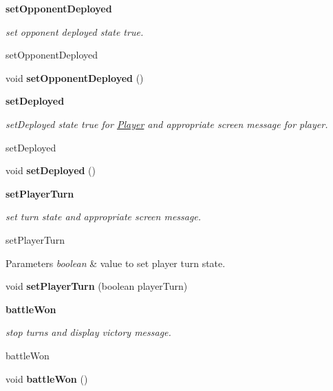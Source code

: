 \begin{Indent}{\bf set\+Opponent\+Deployed}\par
{\em set opponent deployed state true.

set\+Opponent\+Deployed }\begin{DoxyCompactItemize}
\item 
\hypertarget{classbattleship_1_1game_1_1Player_a99bdf9c151fbc819915510085994ec6c}{}void {\bfseries set\+Opponent\+Deployed} ()\label{classbattleship_1_1game_1_1Player_a99bdf9c151fbc819915510085994ec6c}

\end{DoxyCompactItemize}
\end{Indent}
\begin{Indent}{\bf set\+Deployed}\par
{\em set\+Deployed state true for \hyperlink{classbattleship_1_1game_1_1Player}{Player} and appropriate screen message for player.

set\+Deployed }\begin{DoxyCompactItemize}
\item 
\hypertarget{classbattleship_1_1game_1_1Player_ac7a982264933bef991b8bbc19cf6d4b6}{}void {\bfseries set\+Deployed} ()\label{classbattleship_1_1game_1_1Player_ac7a982264933bef991b8bbc19cf6d4b6}

\end{DoxyCompactItemize}
\end{Indent}
\begin{Indent}{\bf set\+Player\+Turn}\par
{\em set turn state and appropriate screen message.

set\+Player\+Turn


\begin{DoxyParams}{Parameters}
{\em boolean} & value to set player turn state. \\
\hline
\end{DoxyParams}
}\begin{DoxyCompactItemize}
\item 
\hypertarget{classbattleship_1_1game_1_1Player_a0e5eee9de5d9d69502cb7dbe1b3996a2}{}void {\bfseries set\+Player\+Turn} (boolean player\+Turn)\label{classbattleship_1_1game_1_1Player_a0e5eee9de5d9d69502cb7dbe1b3996a2}

\end{DoxyCompactItemize}
\end{Indent}
\begin{Indent}{\bf battle\+Won}\par
{\em stop turns and display victory message.

battle\+Won }\begin{DoxyCompactItemize}
\item 
\hypertarget{classbattleship_1_1game_1_1Player_a7f5fc5d13cd31da09e55fb461ec5e7b9}{}void {\bfseries battle\+Won} ()\label{classbattleship_1_1game_1_1Player_a7f5fc5d13cd31da09e55fb461ec5e7b9}

\end{DoxyCompactItemize}
\end{Indent}
